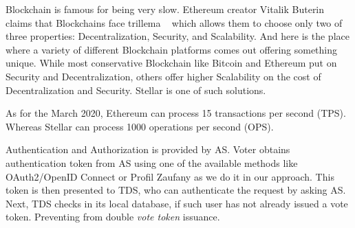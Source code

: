 \documentclass[runningheads]{llncs}
\begin{document}


Blockchain is famous for being very slow. Ethereum creator Vitalik Buterin claims that Blockchains face trillema ~\cite{ethereum} which allows them to choose only two of three properties: Decentralization, Security, and Scalability. 
And here is the place where a variety of different Blockchain platforms comes out offering something unique. While most conservative Blockchain like Bitcoin and Ethereum put on Security and Decentralization, others offer higher Scalability on the cost of Decentralization and Security. Stellar is one of such solutions. 

As for the March 2020, Ethereum can process 15 transactions per second (TPS). Whereas Stellar can process 1000 operations per second (OPS).

Authentication and Authorization is provided by AS.
Voter obtains authentication token from AS using one of the available methods like OAuth2/OpenID Connect or Profil Zaufany 
as we do it in our approach. 
This token is then presented to TDS, who can authenticate the request by asking AS. Next, TDS checks in its local database, if such user has not already issued a vote token. Preventing from double \textit{vote token} issuance.
\end{document}
